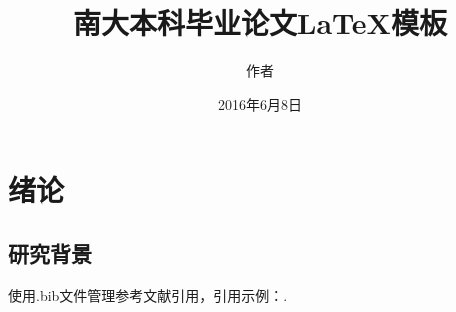 \documentclass[winfonts,bachelor,oneside,nobackinfo]{njuthesis}
\title{南大本科毕业论文\LaTeX 模板}
\author{作者}
\institute{南京大学}
\date{2016年6月8日}
\begin{document}

\maketitle
\makeenglishtitle


\frontmatter

\begin{abstract}
\lipsum[1-2]


\end{abstract}

\begin{englishabstract}
\lipsum[2]


\end{englishabstract}



\tableofcontents



\mainmatter

\chapter{绪论}\label{chapter_introduction}
\section{研究背景}
使用.bib文件管理参考文献引用，引用示例：\cite{BHR12}.\par
\lipsum[1]
\end{document}
